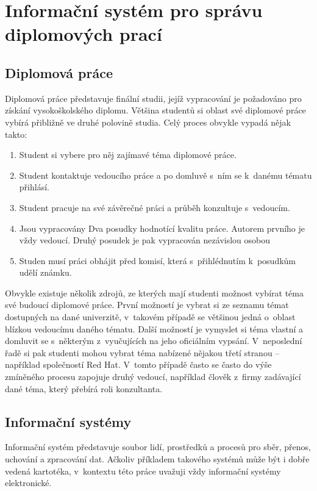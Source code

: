 \chapter{Informační systém pro správu diplomových prací}

\section{Diplomová práce}
Diplomová práce představuje finální studii, jejíž vypracování je požadováno pro získání vysokoškolského diplomu. Většina studentů si oblast své diplomové práce vybírá přibližně ve druhé polovině studia. Celý proces obvykle vypadá nějak takto:
\begin{enumerate}
    \item Student si vybere pro něj zajímavé téma diplomové práce.
    \item Student kontaktuje vedoucího práce a po domluvě s~ním se k~danému tématu přihlásí.
    \item Student pracuje na své závěrečné práci a průběh konzultuje s~vedoucím.
    \item Jsou vypracovány Dva posudky hodnotící kvalitu práce. Autorem prvního je vždy vedoucí. Druhý posudek je pak vypracován nezávislou osobou
    \item Studen musí práci obhájit před komisí, která s~přihlédnutím k~posudkům udělí známku.
\end{enumerate}

Obvykle existuje několik zdrojů, ze kterých mají studenti možnost vybírat téma své budoucí diplomové práce. První možností je vybrat si ze seznamu témat dostupných na dané univerzitě, v~takovém případě se většinou jedná o~oblast blízkou vedoucímu daného tématu. Další možností je vymyslet si téma vlastní a domluvit se s~některým z~vyučujících na jeho oficiálním vypsání. V~neposlední řadě si pak studenti mohou vybrat téma nabízené nějakou třetí stranou -- například společností Red Hat. V~tomto případě často se často do výše zmíněného procesu zapojuje druhý vedoucí, například člověk z~firmy zadávající dané téma, který přebírá roli konzultanta.

\section{Informační systémy}
Informační systém představuje soubor lidí, prostředků a procesů pro sběr, přenos, uchování a zpracování dat. Ačkoliv příkladem takového systémů může být i dobře vedená kartotéka, v~kontextu této práce uvažuji vždy informační systémy elektronické.

